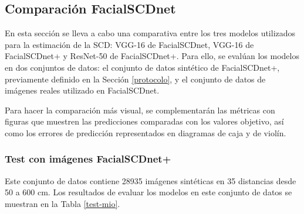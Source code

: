 \subsection{Comparación FacialSCDnet}

En esta sección se lleva a cabo una comparativa entre los tres modelos utilizados para la estimación de la SCD: VGG-16 de FacialSCDnet, VGG-16 de FacialSCDnet+ y ResNet-50 de FacialSCDnet+. Para ello, se evalúan los modelos en dos conjuntos de datos: el conjunto de datos sintético de FacialSCDnet+, previamente definido en la Sección \ref{protocolo}, y el conjunto de datos de imágenes reales utilizado en FacialSCDnet.

Para hacer la comparación más visual, se complementarán las métricas con figuras que muestren las predicciones comparadas con los valores objetivo, así como los errores de predicción representados en diagramas de caja y de violín.

\subsubsection{Test con imágenes FacialSCDnet+}

Este conjunto de datos contiene 28935 imágenes sintéticas en 35 distancias desde 50 a 600 cm. Los resultados de evaluar los modelos en este conjunto de datos se muestran en la Tabla \ref{test-mio}.

